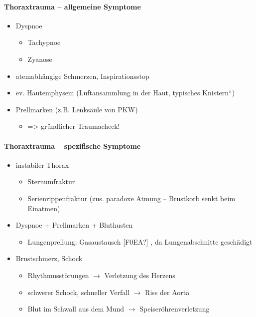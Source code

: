 
\paragraph{Thoraxtrauma -- allgemeine  Symptome}

\begin{itemize}
    \item Dyspnoe
    \begin{itemize}
        \item Tachypnoe
        \item Zyanose
    \end{itemize}
    \item atemabh\"angige  Schmerzen,  Inspirationsstop
    \item ev. Hautemphysem (Luftansammlung in der Haut, typisches
    {\quotedblbase}Knistern{\textquotedblleft})
    \item Prellmarken (z.B. Lenks\"aule von PKW)
    \begin{itemize}
        \item ={\textgreater} gr\"undlicher Traumacheck!
    \end{itemize}
\end{itemize}



\paragraph{Thoraxtrauma -- spezifische  Symptome}

\begin{itemize}
    \item instabiler Thorax
    \begin{itemize}
        \item Sternumfraktur
        \item Serienrippenfraktur (zus. paradoxe Atmung --  Brustkorb senkt beim
        Einatmen)
    \end{itemize}
    \item Dyspnoe + Prellmarken +  Bluthusten
    \begin{itemize}
        \item Lungenprellung: Gasaustausch [F0EA?] , da  Lungenabschnitte
        gesch\"adigt
    \end{itemize}
    \item Brustschmerz, Schock
    \begin{itemize}
        \item Rhythmusst\"orungen ${\rightarrow}$ Verletzung des  Herzens
        \item schwerer Schock, schneller Verfall ${\rightarrow}$ Riss der  Aorta
        \item Blut im Schwall aus dem Mund ${\rightarrow}$
        Speiser\"ohrenverletzung
    \end{itemize}
\end{itemize}


